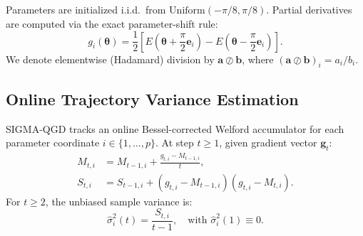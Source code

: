 \documentclass[11pt,a4paper]{article}
\begin{document}
Parameters are initialized i.i.d.\ from $\text{Uniform}(-\pi/8, \pi/8)$. Partial derivatives are computed via the exact parameter-shift rule:
\begin{equation}
g_i(\boldsymbol{\theta}) = \frac{1}{2} \left[ E\left(\boldsymbol{\theta} + \frac{\pi}{2}\mathbf{e}_i\right) - E\left(\boldsymbol{\theta} - \frac{\pi}{2}\mathbf{e}_i\right) \right].
\label{eq:param_shift}
\end{equation}
We denote elementwise (Hadamard) division by $\mathbf{a} \oslash \mathbf{b}$, where $(\mathbf{a} \oslash \mathbf{b})_i = a_i / b_i$.

\subsection{Online Trajectory Variance Estimation}
SIGMA-QGD tracks an online Bessel-corrected Welford accumulator \cite{welford1962note} for each parameter coordinate $i \in \{1, \dots, p\}$. At step $t \ge 1$, given gradient vector $\mathbf{g}_t$:
\begin{align}
M_{t,i} &= M_{t-1,i} + \frac{g_{t,i} - M_{t-1,i}}{t}, \label{eq:welford_m} \\
S_{t,i} &= S_{t-1,i} + (g_{t,i} - M_{t-1,i})(g_{t,i} - M_{t,i}). \label{eq:welford_s}
\end{align}
For $t \ge 2$, the unbiased sample variance is:
\begin{equation}
\hat{\sigma}_i^2(t) = \frac{S_{t,i}}{t - 1}, \quad \text{with } \hat{\sigma}_i^2(1) \equiv 0.
\label{eq:welford_var}
\end{equation}
\end{document}
